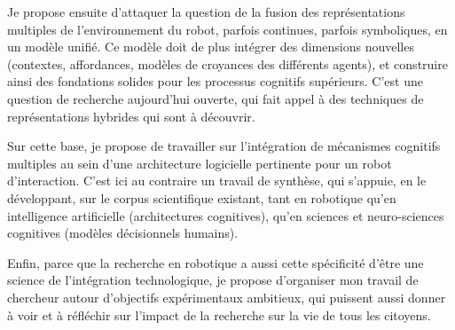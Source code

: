 \documentclass[a4paper]{article}
\begin{document}
Je propose ensuite d'attaquer la question de la fusion des représentations
multiples de l'environnement du robot, parfois continues, parfois symboliques,
en un modèle unifié. Ce modèle doit de plus intégrer des dimensions nouvelles
(contextes, affordances, modèles de croyances des différents agents), et
construire ainsi des fondations solides pour les processus cognitifs supérieurs.
C'est une question de recherche aujourd'hui ouverte, qui fait appel à des
techniques de représentations hybrides qui sont à découvrir.

Sur cette base, je propose de travailler sur l'intégration de mécanismes
cognitifs multiples au sein d'une architecture logicielle pertinente pour un
robot d'interaction. C'est ici au contraire un travail de synthèse, qui
s'appuie, en le développant, sur le corpus scientifique existant, tant en
robotique qu'en intelligence artificielle (architectures cognitives), qu'en
sciences et neuro-sciences cognitives (modèles décisionnels humains).

Enfin, parce que la recherche en robotique a aussi cette spécificité d'être une
science de l'intégration technologique, je propose d'organiser mon travail de
chercheur autour d'objectifs expérimentaux ambitieux, qui puissent aussi donner
à voir et à réfléchir sur l'impact de la recherche sur la vie de tous les
citoyens.

\printbibliography
\end{document}
